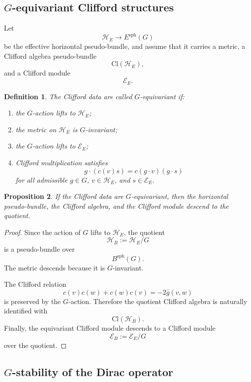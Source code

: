 \documentclass[11pt]{amsart}
\newtheorem{definition}{Definition}[section]
\newtheorem{proposition}[definition]{Proposition}
\begin{document}
\subsection{\(G\)-equivariant Clifford structures}

Let
\[
\mathcal H_E\to E^{\mathrm{sph}}(G)
\]
be the effective horizontal pseudo-bundle, and assume that it carries a metric,
a Clifford algebra pseudo-bundle
\[
\mathrm{Cl}(\mathcal H_E),
\]
and a Clifford module
\[
\mathcal E_E.
\]

\begin{definition}
The Clifford data are called \(G\)-equivariant if:
\begin{enumerate}
\item the \(G\)-action lifts to \(\mathcal H_E\);
\item the metric on \(\mathcal H_E\) is \(G\)-invariant;
\item the \(G\)-action lifts to \(\mathcal E_E\);
\item Clifford multiplication satisfies
\[
g\cdot(c(v)s)
=
c(g\cdot v)(g\cdot s)
\]
for all admissible \(g\in G\), \(v\in\mathcal H_E\), and
\(s\in\mathcal E_E\).
\end{enumerate}
\end{definition}

\begin{proposition}
If the Clifford data are \(G\)-equivariant, then the horizontal pseudo-bundle,
the Clifford algebra, and the Clifford module descend to the quotient.
\end{proposition}

\begin{proof}
Since the action of \(G\) lifts to \(\mathcal H_E\), the quotient
\[
\mathcal H_B:=\mathcal H_E/G
\]
is a pseudo-bundle over
\[
B^{\mathrm{sph}}(G).
\]
The metric descends because it is \(G\)-invariant.

The Clifford relation
\[
c(v)c(w)+c(w)c(v)=-2\bar g(v,w)
\]
is preserved by the \(G\)-action. Therefore the quotient Clifford algebra is
naturally identified with
\[
\mathrm{Cl}(\mathcal H_B).
\]
Finally, the equivariant Clifford module descends to a Clifford module
\[
\mathcal E_B:=\mathcal E_E/G
\]
over the quotient.
\end{proof}

\subsection{\(G\)-stability of the Dirac operator}
\end{document}
